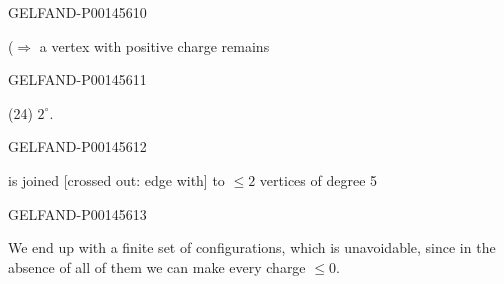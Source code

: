 \begin{GelfandAdjacentEvidence}{GELFAND-P001456}{10}


(\(\Rightarrow\) a vertex with positive charge remains

\end{GelfandAdjacentEvidence}
\begin{GelfandAdjacentEvidence}{GELFAND-P001456}{11}


(24) \(2^\circ\).
\end{GelfandAdjacentEvidence}
\begin{GelfandAdjacentEvidence}{GELFAND-P001456}{12}

is joined [crossed out: edge with] to \(\leqslant2\) vertices of degree 5
\end{GelfandAdjacentEvidence}
\begin{GelfandAdjacentEvidence}{GELFAND-P001456}{13}

\end{GelfandAdjacentEvidence}


We end up with a finite set of configurations, which is unavoidable, since in the absence of all of them we can make every charge \(\leq0\).


